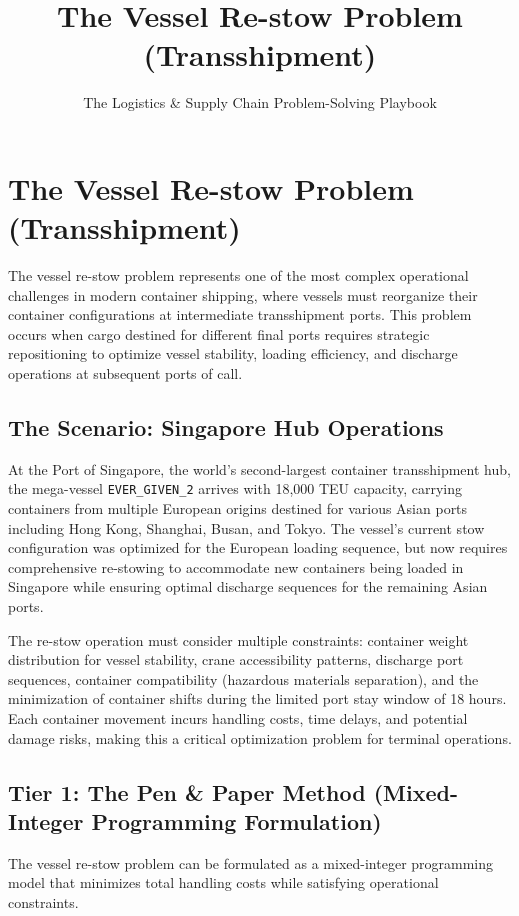 \documentclass{article}
\title{The Vessel Re-stow Problem (Transshipment)}
\author{The Logistics \& Supply Chain Problem-Solving Playbook}
\date{}
\begin{document}
\maketitle

\section{The Vessel Re-stow Problem (Transshipment)}

The vessel re-stow problem represents one of the most complex operational challenges in modern container shipping, where vessels must reorganize their container configurations at intermediate transshipment ports. This problem occurs when cargo destined for different final ports requires strategic repositioning to optimize vessel stability, loading efficiency, and discharge operations at subsequent ports of call.

\subsection{The Scenario: Singapore Hub Operations}

At the Port of Singapore, the world's second-largest container transshipment hub, the mega-vessel \texttt{EVER\_GIVEN\_2} arrives with 18,000 TEU capacity, carrying containers from multiple European origins destined for various Asian ports including Hong Kong, Shanghai, Busan, and Tokyo. The vessel's current stow configuration was optimized for the European loading sequence, but now requires comprehensive re-stowing to accommodate new containers being loaded in Singapore while ensuring optimal discharge sequences for the remaining Asian ports.

The re-stow operation must consider multiple constraints: container weight distribution for vessel stability, crane accessibility patterns, discharge port sequences, container compatibility (hazardous materials separation), and the minimization of container shifts during the limited port stay window of 18 hours. Each container movement incurs handling costs, time delays, and potential damage risks, making this a critical optimization problem for terminal operations.

\subsection{Tier 1: The Pen \& Paper Method (Mixed-Integer Programming Formulation)}

The vessel re-stow problem can be formulated as a mixed-integer programming model that minimizes total handling costs while satisfying operational constraints.
\end{document}
